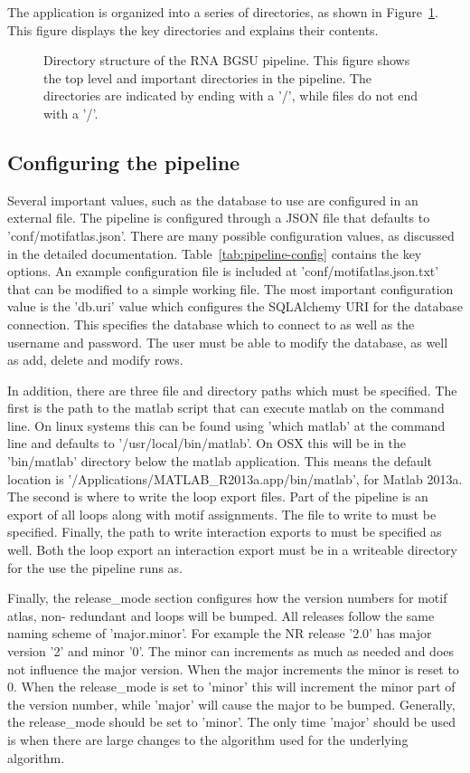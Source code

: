 The application is organized into a series of directories, as shown in
Figure~\ref{fig:pipeline-organization}. This figure displays the key directories
and explains their contents.

\begin{figure}
\caption{Directory structure of the RNA BGSU pipeline. This figure shows the
top level and important directories in the pipeline. The directories are indicated by ending with a
'/', while files do not end with a '/'.}
\label{fig:pipeline-organization}
\end{figure}

\subsection{Configuring the pipeline}

Several important values, such as the database to use are configured in an
external file. The pipeline is configured through a JSON file that defaults to
'conf/motifatlas.json'. There are many possible configuration values, as
discussed in the detailed documentation. Table~\ref{tab:pipeline-config}
contains the key options. An example configuration file is included at
'conf/motifatlas.json.txt' that can be modified to a simple working file. The
most important configuration value is the 'db.uri' value which configures the
SQLAlchemy URI for the database connection. This specifies the database which to
connect to as well as the username and password. The user must be able to modify
the database, as well as add, delete and modify rows.

In addition, there are three file and directory paths which must be specified.
The first is the path to the matlab script that can execute matlab on the
command line. On linux systems this can be found using 'which matlab' at the
command line and defaults to '/usr/local/bin/matlab'. On OSX this will be in the
'bin/matlab' directory below the matlab application. This means the default
location is '/Applications/MATLAB\_R2013a.app/bin/matlab', for Matlab 2013a. The
second is where to write the loop export files. Part of the pipeline is an
export of all loops along with motif assignments. The file to write to must be
specified. Finally, the path to write interaction exports to must be specified
as well. Both the loop export an interaction export must be in a writeable
directory for the use the pipeline runs as.

Finally, the release\_mode section configures how the version numbers for motif
atlas, non- redundant and loops will be bumped. All releases follow the same
naming scheme of 'major.minor'. For example the NR release '2.0' has major
version '2' and minor '0'. The minor can increments as much as needed and does
not influence the major version. When the major increments the minor is reset to
0. When the release\_mode is set to 'minor' this will increment the minor part
of the version number, while 'major' will cause the major to be bumped.
Generally, the release\_mode should be set to 'minor'. The only time 'major'
should be used is when there are large changes to the algorithm used for the
underlying algorithm.

